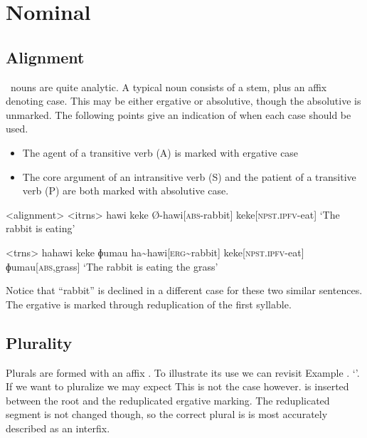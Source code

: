 \chapter{Nominal}
\section{Alignment}

\langname\ nouns are quite analytic. A typical noun consists of a stem, plus an affix denoting case. This may be either ergative or absolutive, though the absolutive is unmarked. The following points give an indication of when each case should be used.
\begin{itemize}
  \item The agent of a transitive verb (A) is marked with ergative case
  \item The core argument of an intransitive verb (S) and the patient of a transitive verb (P) are both marked with absolutive case.
\end{itemize}

\pex<alignment>
\a<itrns>
\begingl
\glpreamble hawi keke
\endpreamble
Ø-hawi[\textsc{abs-}rabbit]
keke[\textsc{npst.ipfv-}eat]
\glft `The rabbit is eating'
\endgl


\a<trns>
\begingl
\glpreamble hahawi keke ɸumau
\endpreamble
ha\textasciitilde hawi[\textsc{erg\textasciitilde}rabbit]
keke[\textsc{npst.ipfv-}eat]
ɸumau[\textsc{abs,}grass]
\glft `The rabbit is eating the grass'
\endgl
\xe

Notice that ``rabbit'' is declined in a different case for these two similar sentences. The ergative is marked through reduplication of the first syllable.

\section{Plurality}

Plurals are formed with an affix . To illustrate its use we can revisit Example . `'. If we want to pluralize  we may expect  This is not the case however.  is inserted between the root and the reduplicated ergative marking. The reduplicated segment is not changed though, so the correct plural is   is most accurately described as an interfix.

